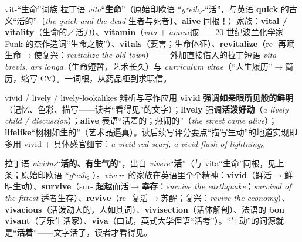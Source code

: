 \documentclass[../main.tex]{subfiles}
\begin{document}
\begin{gram}{vit-“生命”词族}
拉丁语 \textit{vita}“\textbf{生命}”（原始印欧语 *\textit{gʷeih₃-}“活”，与英语 \textbf{quick} 的古义“活的”〔\textit{the quick and the dead} 生者与死者〕、\textbf{alive} 同根！）家族：\textbf{vital / vitality}（生命的／活力）、\textbf{vitamin}（\textit{vita} $+$ \textit{amine}胺——20 世纪波兰化学家 Funk 的杰作造词“生命之胺”）、\textbf{vitals}（要害；生命体征）、\textbf{revitalize}（re- 再赋生命$\to$使复兴：\textit{revitalize the old town}）——外加直接借入的拉丁短语 \textit{vita brevis, ars longa}（生命短暂，艺术长久）与 \textit{curriculum vitae}（“人生履历”$\to$简历，缩写 CV）。一词根，从药品柜到求职信。
\end{gram}



\begin{gram}{vivid / lively / lively-lookalikes 辨析与写作应用}
\textbf{vivid} 强调\textbf{如亲眼所见般的鲜明}（记忆、色彩、描写——读者“看得见”的文字）；\textbf{lively} 强调\textbf{活泼好动}（\textit{a lively child / discussion}）；\textbf{alive} 表语“活着的；热闹的”（\textit{the street came alive}）；\textbf{lifelike}“栩栩如生的”（艺术品逼真）。读后续写评分要点“描写生动”的地道实现即多用 vivid + 具体感官细节：\textit{a vivid red scarf, a vivid flash of lightning}。
\end{gram}

\begin{origin}
拉丁语 \textit{vividus}“\textbf{活的、有生气的}”，出自 \textit{vivere}“\textbf{活}”（与 vita“生命”同根，见上条；原始印欧语 *\textit{gʷeih₃-}）。\textit{vivere} 的家族在英语里个个精神：\textbf{vivid}（鲜活$\to$鲜明生动）、\textbf{survive}（sur- 超越而活$\to$\textbf{幸存}：\textit{survive the earthquake}；\textit{survival of the fittest} 适者生存）、\textbf{revive}（re- 复活$\to$苏醒；复兴：\textit{revive the economy}）、\textbf{vivacious}（活泼动人的，人如其词）、\textbf{vivisection}（活体解剖）、法语的 \textbf{bon vivant}（享乐生活家）、\textbf{viva}（口试，英式大学俚语“活考”）。“生动”的词源就是“\textbf{活着}”——文字活了，读者才看得见。
\end{origin}
\end{document}
